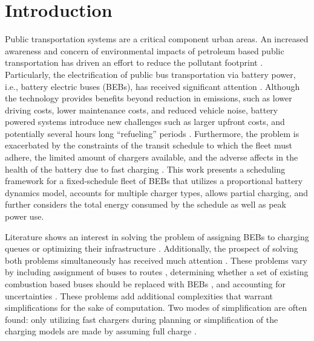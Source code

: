 \documentclass[ee,thesis]{usuthesis}
\begin{document}
\section{Introduction}
\label{sec:sa-introduction}
Public transportation systems are a critical component urban areas. An increased awareness and concern of environmental
impacts of petroleum based public transportation has driven an effort to reduce the pollutant footprint
\cite{de-2014-simul-elect,xylia-2018-role-charg,guida-2017-zeeus-repor-europ,li-2016-batter-elect}. Particularly,
the electrification of public bus transportation via battery power, i.e., battery electric buses (BEBs), has received
significant attention \cite{li-2016-batter-elect}. Although the technology provides benefits beyond reduction in
emissions, such as lower driving costs, lower maintenance costs, and reduced vehicle noise, battery powered systems
introduce new challenges such as larger upfront costs, and potentially several hours long ``refueling'' periods
\cite{xylia-2018-role-charg,li-2016-batter-elect}. Furthermore, the problem is exacerbated by the constraints of the
transit schedule to which the fleet must adhere, the limited amount of chargers available, and the adverse affects in
the health of the battery due to fast charging \cite{lutsey-2019-updat-elect}. This work presents a scheduling
framework for a fixed-schedule fleet of BEBs that utilizes a proportional battery dynamics model, accounts for multiple
charger types, allows partial charging, and further considers the total energy consumed by the schedule as well as peak
power use.

Literature shows an interest in solving the problem of assigning BEBs to charging queues or optimizing their
infrastructure \cite{wei-2018-optim-spatio,sebastiani-2016-evaluat-elect,hoke-2014-accoun-lithium,wang-2017-elect-vehic}. Additionally, the prospect of solving both problems simultaneously
has received much attention \cite{wei-2018-optim-spatio,sebastiani-2016-evaluat-elect,hoke-2014-accoun-lithium,wang-2017-elect-vehic}. These problems vary by including assignment of buses to routes
\cite{rinaldi-2020-mixed-fleet,zhou-2020-collab-optim,tang-2019-robus-sched,li-2014-trans-bus}, determining
whether a set of existing combustion based buses should be replaced with BEBs \cite{zhou-2020-bi-objec,duan-2021-refor-mixed,rinaldi-2020-mixed-fleet,zhou-2020-collab-optim}, and accounting for uncertainties
\cite{bie-2021-optim-elect,duan-2021-refor-mixed,tang-2019-robus-sched,ursavas-2016-optim-polic}. These problems
add additional complexities that warrant simplifications for the sake of computation. Two modes of simplification are
often found: only utilizing fast chargers during planning \cite{li-2014-trans-bus,li-2014-trans-bus,wang-2017-optim-rechar} or simplification of the charging models are made by assuming full charge
\cite{zhou-2020-bi-objec,qarebagh-2019-optim-sched,wei-2018-optim-spatio}.
\end{document}
